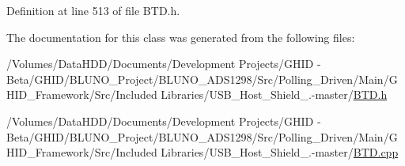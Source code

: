 \-Definition at line 513 of file \-B\-T\-D.\-h.



\-The documentation for this class was generated from the following files\-:\begin{DoxyCompactItemize}
\item 
/\-Volumes/\-Data\-H\-D\-D/\-Documents/\-Development Projects/\-G\-H\-I\-D -\/ Beta/\-G\-H\-I\-D/\-B\-L\-U\-N\-O\-\_\-\-Project/\-B\-L\-U\-N\-O\-\_\-\-A\-D\-S1298/\-Src/\-Polling\-\_\-\-Driven/\-Main/\-G\-H\-I\-D\-\_\-\-Framework/\-Src/\-Included Libraries/\-U\-S\-B\-\_\-\-Host\-\_\-\-Shield\-\_.-\/master/\hyperlink{_b_t_d_8h}{\-B\-T\-D.\-h}\item 
/\-Volumes/\-Data\-H\-D\-D/\-Documents/\-Development Projects/\-G\-H\-I\-D -\/ Beta/\-G\-H\-I\-D/\-B\-L\-U\-N\-O\-\_\-\-Project/\-B\-L\-U\-N\-O\-\_\-\-A\-D\-S1298/\-Src/\-Polling\-\_\-\-Driven/\-Main/\-G\-H\-I\-D\-\_\-\-Framework/\-Src/\-Included Libraries/\-U\-S\-B\-\_\-\-Host\-\_\-\-Shield\-\_.-\/master/\hyperlink{_b_t_d_8cpp}{\-B\-T\-D.\-cpp}\end{DoxyCompactItemize}
